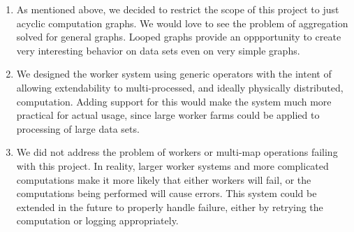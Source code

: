 \documentclass{article}
\begin{document}
\begin{enumerate}
\item As mentioned above, we decided to restrict the scope of this project to just
  acyclic computation graphs. We would love to see the problem of aggregation
  solved for general graphs. Looped graphs provide an oppportunity to create
  very interesting behavior on data sets even on very simple graphs.
\item We designed the worker system using generic operators with the intent of
  allowing extendability to multi-processed, and ideally physically distributed,
  computation. Adding support for this would make the system much more practical
  for actual usage, since large worker farms could be applied to processing of
  large data sets.
\item We did not address the problem of workers or multi-map operations failing
  with this project. In reality, larger worker systems and more complicated
  computations make it more likely that either workers will fail, or the computations
  being performed will cause errors. This system could be extended in the future
  to properly handle failure, either by retrying the computation or logging
  appropriately.
\end{enumerate}
\end{document}

